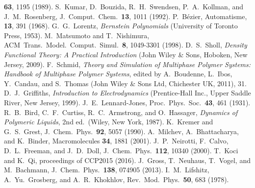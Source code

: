 \textbf{63}, 1195 (1989).
%
S.~Kumar, D.~Bouzida, R.~H.\ Swendsen, P.~A.\ Kollman, and
J.~M.\ Rosenberg, J.~Comput.\ Chem.\ \textbf{13}, 1011 (1992).
%
P.~B{\'e}zier, Automatisme, \textbf{13}, 391 (1968).
%
G.~G.~Lorentz, \emph{Bernstein Polynomials} (University of Toronto Press, 1953).
%
M.~Matsumoto and T.~Nishimura, ACM\ Trans.\ Model.\ Comput.\ Simul.\ \textbf{8}, 1049-3301 (1998).
%
%
%
D.~S.~Sholl, \emph{Density Functional Theory: A Practical Introduction} (John Wiley \& Sons, Hoboken, New Jersey, 2009).
%
F.~Schmid, \emph{Theory and Simulation of Multiphase Polymer Systems:
Handbook of Multiphase Polymer Systems}, edited by A.~Boudenne, L.~Ibos,
Y.~Candau, and S.~Thomas (John Wiley \& Sons Ltd, Chichester UK, 2011), 31.
%
D.~J.~Griffiths, \emph{Introduction to Electrodynamics} (Prentice-Hall Inc., Upper Saddle River, New Jersey, 1999).
%
%
J.~E.~Lennard-Jones, Proc.\ Phys.\ Soc.\  \textbf{43}, 461 (1931).
%
%
R.~B.\ Bird, C.~F.\ Curtiss, R.~C.\ Armstrong, and O.~Hassager,
\emph{Dynamics of Polymeric Liquids}, 2nd ed.\ (Wiley, New York,
1987).
%
K.~Kremer and G.~S.\ Grest, J.~Chem.\ Phys.\ \textbf{92}, 5057 (1990).
%
A.~Milchev, A.~Bhattacharya, and K.~Binder, Macromolecules \textbf{34},
1881 (2001).
%
J.~P.~Neirotti, F.~Calvo, D.~L.~Freeman, and J.~D.~Doll, J.~Chem.\ Phys.\ \textbf{112}, 10340 (2000).
%
T.~Koci and K.~Qi, proceedings of CCP2015 (2016).
%
%
%
J.~Gross, T.~Neuhaus, T.~Vogel, and M.~Bachmann, J.~Chem.\ Phys.\
\textbf{138}, 074905 (2013).
%
%
I.~M.\ Lifshitz, A.~Yu.\ Grosberg, and A.~R.\ Khokhlov, Rev.\ Mod.\
Phys.\ \textbf{50}, 683 (1978).
%
